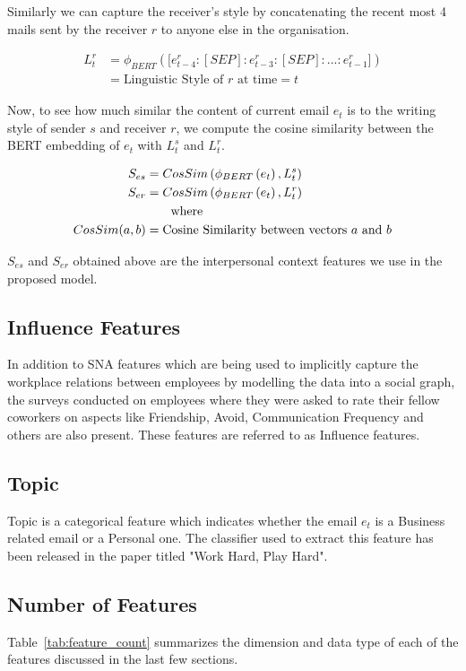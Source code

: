 Similarly we can capture the receiver's style by concatenating the recent most 4 mails sent by the receiver $r$ to anyone else in the organisation.

\begin{equation}
\begin{aligned}
L_{t}^{r} &= \phi_{BERT} \left( \bigl[ e_{t-4}^{r}:[SEP]:e_{t-3}^{r}:[SEP]:...:e_{t-1}^{r} \bigr]\right) \\
&= \text{Linguistic Style of $r$ at time} = t 
\end{aligned}
\end{equation}

Now, to see how much similar the content of current email $e_t$ is to the writing style of sender $s$ and receiver $r$, we compute the cosine similarity between the BERT embedding of $e_t$ with $L_{t}^{s}$ and $L_{t}^{r}$.

\begin{equation}
\begin{aligned}
S_{es} &= CosSim \left( \phi_{BERT} \left(e_t \right) ,L_{t}^{s} \right) \\
S_{er} &= CosSim \left( \phi_{BERT} \left(e_t \right) ,L_{t}^{r} \right) \\
&\hspace{0.7cm}\text{where} \\ 
CosSim(a,b) &= \text{Cosine Similarity between vectors $a$ and $b$}
\end{aligned}
\end{equation}

$S_{es}$ and $S_{er}$ obtained above are the interpersonal context features we use in the proposed model.

\subsection{Influence Features}
In addition to SNA features which are being used to implicitly capture the workplace relations between employees by modelling the data into a social graph, the surveys conducted on employees where they were asked to rate their fellow coworkers on aspects like Friendship, Avoid, Communication Frequency and others are also present. These features are referred to as Influence features.

\subsection{Topic}

Topic is a categorical feature which indicates whether the email $e_t$ is a Business related email or a Personal one. The classifier used to extract this feature has been released in the paper titled "Work Hard, Play Hard"\cite{alkhereyf-rambow-2017-work}.

\subsection{Number of Features}

Table~\ref{tab:feature_count} summarizes the dimension and data type of each of the features discussed in the last few sections. 






